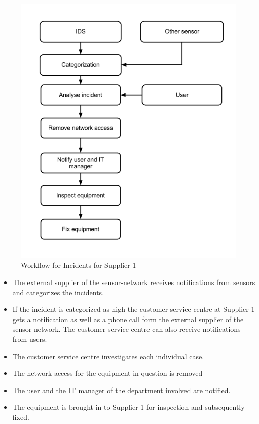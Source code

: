 \begin{figure}[H]
\begin{center}
\includegraphics[scale=0.54]{WorkflowCaseBSupplier1.png}
\caption[Workflow for Incidents, Case B Supplier 1]{Workflow for Incidents for Supplier 1}
\label{fig:WorkflowCaseBSupplier1}
\end{center}
\end{figure}

\begin{itemize}
\item The external supplier of the sensor-network receives notifications from sensors and categorizes the incidents.
\item If the incident is categorized as high the customer service centre at Supplier 1 gets a notification as well as a phone call form the external supplier of the sensor-network. The customer service centre can also receive notifications from users.
\item The customer service centre investigates each individual case.
\item The network access for the equipment in question is removed 
\item The user and the IT manager of the department involved are notified.
\item The equipment is brought in to Supplier 1 for inspection and subsequently fixed.
\end{itemize}

